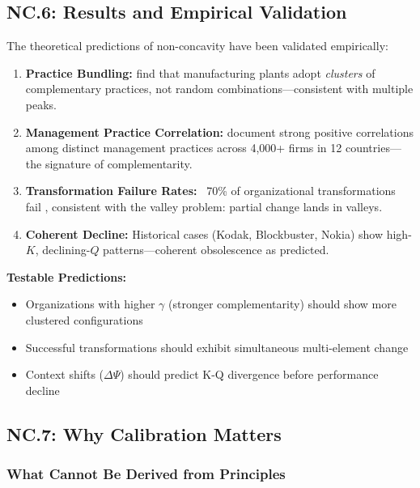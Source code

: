 \subsection{NC.6: Results and Empirical Validation}
\label{sec:nc-results}

The theoretical predictions of non-concavity have been validated empirically:

\begin{enumerate}
\item \textbf{Practice Bundling:} \citet{ichniowski1997} find that manufacturing plants adopt \textit{clusters} of complementary practices, not random combinations---consistent with multiple peaks.

\item \textbf{Management Practice Correlation:} \citet{bloom2007} document strong positive correlations among distinct management practices across 4,000+ firms in 12 countries---the signature of complementarity.

\item \textbf{Transformation Failure Rates:} ~70\% of organizational transformations fail \citep{mckinsey2015}, consistent with the valley problem: partial change lands in valleys.

\item \textbf{Coherent Decline:} Historical cases (Kodak, Blockbuster, Nokia) show high-$K$, declining-$Q$ patterns---coherent obsolescence as predicted.
\end{enumerate}

\textbf{Testable Predictions:}
\begin{itemize}[nosep]
\item Organizations with higher $\gamma$ (stronger complementarity) should show more clustered configurations
\item Successful transformations should exhibit simultaneous multi-element change
\item Context shifts ($\Delta\Psi$) should predict K-Q divergence before performance decline
\end{itemize}


\subsection{NC.7: Why Calibration Matters}
\label{sec:nc-calibration}

\subsubsection{What Cannot Be Derived from Principles}

